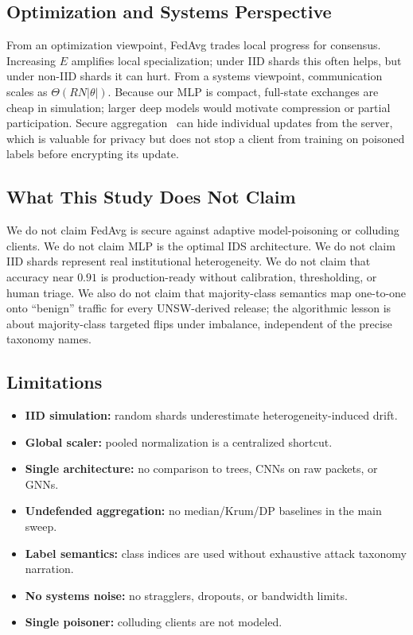 \documentclass[journal]{IEEEtran}
\begin{document}
\subsection{Optimization and Systems Perspective}
From an optimization viewpoint, FedAvg trades local progress for consensus. Increasing $E$ amplifies local specialization; under IID shards this often helps, but under non-IID shards it can hurt. From a systems viewpoint, communication scales as $\Theta(R N |\theta|)$. Because our MLP is compact, full-state exchanges are cheap in simulation; larger deep models would motivate compression or partial participation. Secure aggregation~\cite{bonawitz2019towards} can hide individual updates from the server, which is valuable for privacy but does not stop a client from training on poisoned labels before encrypting its update.

\subsection{What This Study Does Not Claim}
We do not claim FedAvg is secure against adaptive model-poisoning or colluding clients. We do not claim MLP is the optimal IDS architecture. We do not claim IID shards represent real institutional heterogeneity. We do not claim that accuracy near $0.91$ is production-ready without calibration, thresholding, or human triage. We also do not claim that majority-class semantics map one-to-one onto ``benign'' traffic for every UNSW-derived release; the algorithmic lesson is about majority-class targeted flips under imbalance, independent of the precise taxonomy names.

\subsection{Limitations}
\begin{itemize}
\item \textbf{IID simulation:} random shards underestimate heterogeneity-induced drift.
\item \textbf{Global scaler:} pooled normalization is a centralized shortcut.
\item \textbf{Single architecture:} no comparison to trees, CNNs on raw packets, or GNNs.
\item \textbf{Undefended aggregation:} no median/Krum/DP baselines in the main sweep.
\item \textbf{Label semantics:} class indices are used without exhaustive attack taxonomy narration.
\item \textbf{No systems noise:} no stragglers, dropouts, or bandwidth limits.
\item \textbf{Single poisoner:} colluding clients are not modeled.
\end{itemize}
\end{document}
